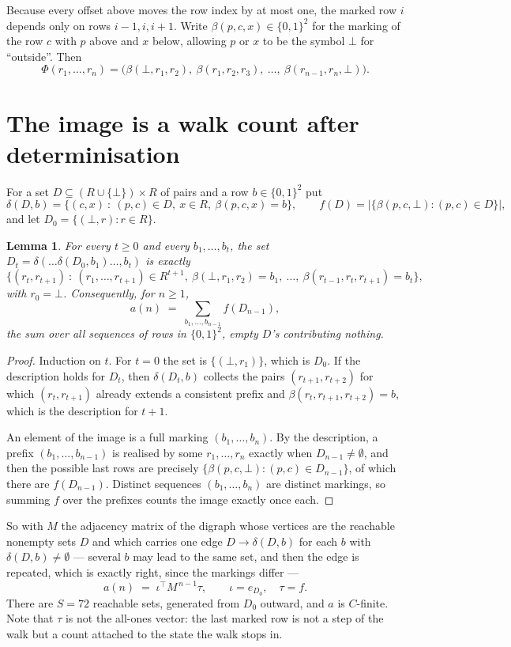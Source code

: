 \documentclass[11pt,a4paper]{article}
\theoremstyle{plain}
\newtheorem{lemma}[theorem]{Lemma}
\theoremstyle{definition}
\begin{document}
Because every offset above moves the row index by at most one, the marked row $i$ depends only
on rows $i-1,i,i+1$. Write $\beta(p,c,x)\in\{0,1\}^{2}$ for the marking of the row $c$
with $p$ above and $x$ below, allowing $p$ or $x$ to be the symbol $\bot$ for ``outside''.
Then
\[
\Phi(r_1,\dots,r_n)=\bigl(\beta(\bot,r_1,r_2),\ \beta(r_1,r_2,r_3),\ \dots,\
\beta(r_{n-1},r_n,\bot)\bigr).
\]

\section{The image is a walk count after determinisation}

For a set $D\subseteq(R\cup\{\bot\})\times R$ of pairs and a row $b\in\{0,1\}^{2}$ put
\[
\delta(D,b)=\{(c,x)\ :\ (p,c)\in D,\ x\in R,\ \beta(p,c,x)=b\},\qquad
f(D)=\bigl|\{\beta(p,c,\bot):(p,c)\in D\}\bigr| ,
\]
and let $D_0=\{(\bot,r):r\in R\}$.

\begin{lemma}\label{lem:det}
For every $t\ge0$ and every $b_1,\dots,b_t$, the set
$D_t=\delta(\dots\delta(D_0,b_1)\dots,b_t)$ is exactly
\[
\{(r_t,r_{t+1})\ :\ (r_1,\dots,r_{t+1})\in R^{t+1},\ \beta(\bot,r_1,r_2)=b_1,\ \dots,\
\beta(r_{t-1},r_t,r_{t+1})=b_t\} ,
\]
with $r_0=\bot$. Consequently, for $n\ge1$,
\[
a(n)\;=\;\sum_{b_1,\dots,b_{n-1}}f(D_{n-1}),
\]
the sum over all sequences of rows in $\{0,1\}^{2}$, empty $D$'s contributing nothing.
\end{lemma}

\begin{proof}
Induction on $t$. For $t=0$ the set is $\{(\bot,r_1)\}$, which is $D_0$. If the description
holds for $D_t$, then $\delta(D_t,b)$ collects the pairs $(r_{t+1},r_{t+2})$ for which
$(r_t,r_{t+1})$ already extends a consistent prefix and
$\beta(r_t,r_{t+1},r_{t+2})=b$, which is the description for $t+1$.

An element of the image is a full marking $(b_1,\dots,b_n)$. By the description, a prefix
$(b_1,\dots,b_{n-1})$ is realised by some $r_1,\dots,r_n$ exactly when $D_{n-1}\neq
\emptyset$, and then the possible last rows are precisely
$\{\beta(p,c,\bot):(p,c)\in D_{n-1}\}$, of which there are $f(D_{n-1})$. Distinct
sequences $(b_1,\dots,b_n)$ are distinct markings, so summing $f$ over the prefixes counts the
image exactly once each.
\end{proof}

So with $M$ the adjacency matrix of the digraph whose vertices are the reachable nonempty sets
$D$ and which carries one edge $D\to\delta(D,b)$ for each $b$ with $\delta(D,b)\neq\emptyset$
--- several $b$ may lead to the same set, and then the edge is repeated, which is exactly
right, since the markings differ ---
\[
a(n)\;=\;\iota^{\!\top}M^{\,n-1}\tau,\qquad \iota=e_{D_0},\quad \tau=f .
\]
There are $S=72$ reachable sets, generated from $D_0$ outward, and $a$ is $C$-finite. Note
that $\tau$ is not the all-ones vector: the last marked row is not a step of the walk but a
count attached to the state the walk stops in.
\end{document}
